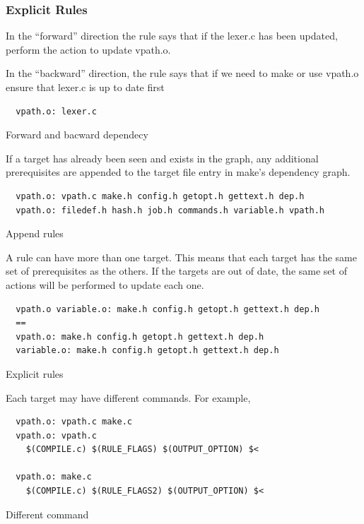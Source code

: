 \subsubsection{Explicit Rules}%
\label{ssub:explicit_rules}

In the “forward” direction the rule says that if the lexer.c has been updated, perform the action to update vpath.o.

In the “backward” direction, the rule says that if we need to make or use vpath.o ensure that lexer.c is up to date first

\begin{listing}[!ht]
\begin{verbatim}
  vpath.o: lexer.c
\end{verbatim}
\caption{Forward and bacward dependecy}
\label{makefile_bi_directional_dependency}
\end{listing}

If a target has already been seen and exists in the graph, any additional prerequisites are appended to the target file entry in make’s dependency graph.


\begin{listing}[!ht]
\begin{verbatim}
  vpath.o: vpath.c make.h config.h getopt.h gettext.h dep.h
  vpath.o: filedef.h hash.h job.h commands.h variable.h vpath.h
\end{verbatim}
\caption{Append rules}
\label{makefile_append_rules}
\end{listing}

A rule can have more than one target. This means that each target has the same set of prerequisites as the others. If the targets are out of date, the same set of actions will be performed to update each one.


\begin{listing}[!ht]
\begin{verbatim}
  vpath.o variable.o: make.h config.h getopt.h gettext.h dep.h
  ==
  vpath.o: make.h config.h getopt.h gettext.h dep.h
  variable.o: make.h config.h getopt.h gettext.h dep.h
\end{verbatim}
\caption{Explicit rules}
\label{makefile_explicit_rules}
\end{listing}

Each target may have different commands. For example,

\begin{listing}[!ht]
\begin{verbatim}
  vpath.o: vpath.c make.c
  vpath.o: vpath.c
    $(COMPILE.c) $(RULE_FLAGS) $(OUTPUT_OPTION) $<

  vpath.o: make.c
    $(COMPILE.c) $(RULE_FLAGS2) $(OUTPUT_OPTION) $<
\end{verbatim}
\caption{Different command}
\label{different_command}
\end{listing}

